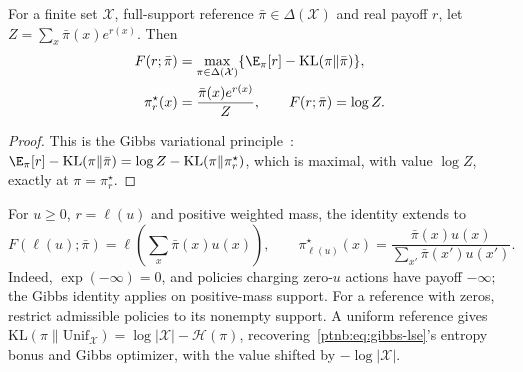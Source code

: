\begin{lemmaenv}\label{ptnb:lem:kl-legendre-fenchel}
For a finite set $\mathcal X$, full-support reference $\bar\pi\in\Delta(\mathcal X)$ and real payoff $r$, let $Z=\sum_x\bar\pi(x)e^{r(x)}$. Then
\begin{align}
    F(r;\bar\pi)&=\max_{\pi\in\Delta(\mathcal X)}
       \{\E_\pi[r]-\mathrm{KL}(\pi\|\bar\pi)\},\label{ptnb:eq:kl-lf-objective}\\
    \pi_r^\star(x)&=\frac{\bar\pi(x)e^{r(x)}}{Z},
       \qquad F(r;\bar\pi)=\log Z.\label{ptnb:eq:kl-lf-optimizer}
\end{align}
\end{lemmaenv}
\begin{proof}
This is the Gibbs variational principle~\parencite{BoydVandenberghe2004}:
$\E_\pi[r]-\mathrm{KL}(\pi\|\bar\pi)=\log Z-\mathrm{KL}(\pi\|\pi_r^\star)$,
which is maximal, with value $\log Z$, exactly at $\pi=\pi_r^\star$.
\end{proof}
For $u\ge0$, $r=\ell(u)$ and positive weighted mass, the identity extends to
\begin{equation}\label{ptnb:eq:kl-lf-linearized}
    F(\ell(u);\bar\pi)=\ell\!\left(\sum_x\bar\pi(x)u(x)\right),
    \qquad \pi_{\ell(u)}^\star(x)=\frac{\bar\pi(x)u(x)}{\sum_{x'}\bar\pi(x')u(x')}.
\end{equation}
Indeed, $\exp(-\infty)=0$, and policies charging zero-$u$ actions have payoff $-\infty$; the Gibbs identity applies on positive-mass support. For a reference with zeros, restrict admissible policies to its nonempty support. A uniform reference gives $\mathrm{KL}(\pi\|\mathrm{Unif}_{\mathcal X})=\log|\mathcal X|-\mathcal H(\pi)$, recovering~\eqref{ptnb:eq:gibbs-lse}'s entropy bonus and Gibbs optimizer, with the value shifted by $-\log|\mathcal X|$.

